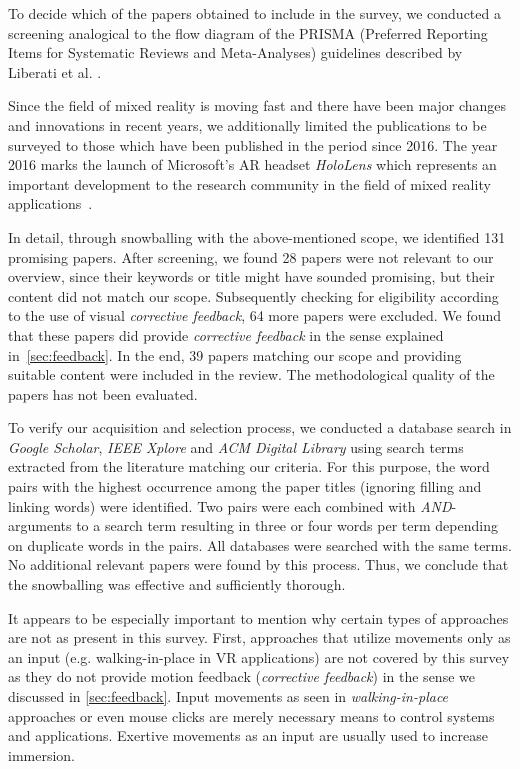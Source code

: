 To decide which of the papers obtained to include in the survey, we conducted a screening analogical to the flow diagram of the PRISMA (Preferred Reporting Items for Systematic Reviews and Meta-Analyses) guidelines described by Liberati et al. \cite{liberati2009prisma}.

Since the field of mixed reality is moving fast and there have been major changes and innovations in recent years, we additionally limited the publications to be surveyed to those which have been published in the period since 2016. The year 2016 marks the launch of Microsoft's AR headset \emph{HoloLens} which represents an important development to the research community in the field of mixed reality applications~\cite{Park2021}.

In detail, through snowballing with the above-mentioned scope, we identified 131 promising papers. After screening, we found 28 papers were not relevant to our overview, since their keywords or title might have sounded promising, but their content did not match our scope. Subsequently checking for eligibility according to the use of visual \emph{corrective feedback}, 64 more papers were excluded. We found that these papers did provide \emph{corrective feedback} in the sense explained in~\autoref{sec:feedback}. In the end, 39 papers matching our scope and providing suitable content were included in the review. The methodological quality of the papers has not been evaluated.

To verify our acquisition and selection process, we conducted a database search in \emph{Google Scholar}, \emph{IEEE Xplore} and \emph{ACM Digital Library} using search terms extracted from the literature matching our criteria. For this purpose, the word pairs with the highest occurrence among the paper titles (ignoring filling and linking words) were identified. Two pairs were each combined with \textit{AND}-arguments to a search term resulting in three or four words per term depending on duplicate words in the pairs. All databases were searched with the same terms. No additional relevant papers were found by this process. Thus, we conclude that the snowballing was effective and sufficiently thorough.

It appears to be especially important to mention why certain types of approaches are not as present in this survey. First, approaches that utilize movements only as an input (e.g. walking-in-place in VR applications) are not covered by this survey as they do not provide motion feedback (\emph{corrective feedback}) in the sense we discussed in \autoref{sec:feedback}. Input movements as seen in \emph{walking-in-place} approaches or even mouse clicks are merely necessary means to control systems and applications. Exertive movements as an input are usually used to increase immersion. 

